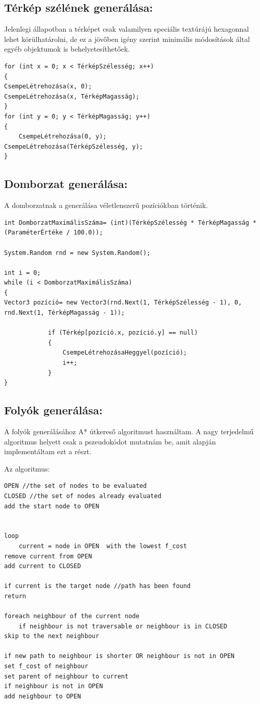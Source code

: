 \subsection{Térkép szélének generálása:}

Jelenlegi állapotban a térképet csak valamilyen speciális textúrájú hexagonnal lehet körülhatárolni, de ez a jövőben igény szerint minimális módosítások által egyéb objektumok is behelyetesíthetőek. 

\begin{verbatim}
for (int x = 0; x < TérképSzélesség; x++)
{
CsempeLétrehozása(x, 0);
CsempeLétrehozása(x, TérképMagasság);
}
for (int y = 0; y < TérképMagasság; y++)
{
	CsempeLétrehozása(0, y);
CsempeLétrehozása(TérképSzélesség, y);
}
\end{verbatim}

\subsection{Domborzat generálása:}

A domborzatnak a generálása véletlenszerű pozíciókban történik.

\begin{verbatim}
int DomborzatMaximálisSzáma= (int)(TérképSzélesség * TérképMagasság * (ParaméterÉrtéke / 100.0));

System.Random rnd = new System.Random();

int i = 0;
while (i < DomborzatMaximálisSzáma)
{
Vector3 pozíció= new Vector3(rnd.Next(1, TérképSzélesség - 1), 0, rnd.Next(1, TérképMagasság - 1));

            if (Térkép[pozíció.x, pozíció.y] == null)
            {
                CsempeLétrehozásaHeggyel(pozíció);
                i++;
            }
}
\end{verbatim}

\subsection{Folyók generálása:}

A folyók generálásához A* útkereső algoritmust használtam. A nagy terjedelmű algoritmus helyett csak a pszeudokódot mutatnám be, amit alapján implementáltam ezt a részt.

Az algoritmus:

\begin{verbatim}
OPEN //the set of nodes to be evaluated
CLOSED //the set of nodes already evaluated
add the start node to OPEN


loop
	current = node in OPEN  with the lowest f_cost
remove current from OPEN
add current to CLOSED

if current is the target node //path has been found
return

foreach neighbour of the current node
	if neighbour is not traversable or neighbour is in CLOSED
skip to the next neighbour

if new path to neighbour is shorter OR neighbour is not in OPEN
set f_cost of neighbour
set parent of neighbour to current
if neighbour is not in OPEN
add neighbour to OPEN
\end{verbatim}

